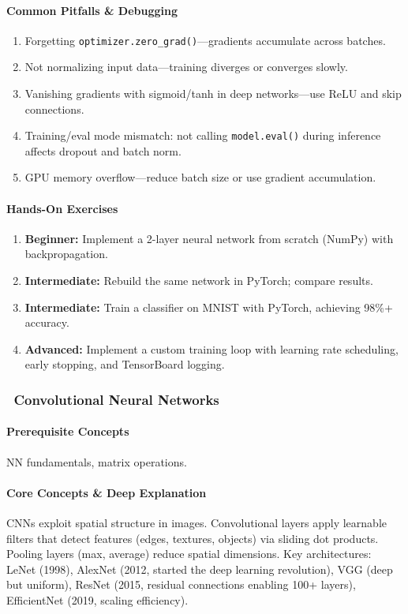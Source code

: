 \documentclass[11pt, a4paper, oneside]{report}
\newcommand{\mustmaster}[1]{\subsubsection{\texorpdfstring{\fcolorbox{blue!40!black}{blue!8}{\footnotesize\bfseries\color{blue!40!black} MUST MASTER}~#1}{#1}}}
\begin{document}
\paragraph{Common Pitfalls \& Debugging}
\begin{enumerate}[leftmargin=*]
\item Forgetting \texttt{optimizer.zero\_grad()}---gradients accumulate across batches.
\item Not normalizing input data---training diverges or converges slowly.
\item Vanishing gradients with sigmoid/tanh in deep networks---use ReLU and skip connections.
\item Training/eval mode mismatch: not calling \texttt{model.eval()} during inference affects dropout and batch norm.
\item GPU memory overflow---reduce batch size or use gradient accumulation.
\end{enumerate}

\paragraph{Hands-On Exercises}
\begin{enumerate}[leftmargin=*]
\item \textbf{Beginner:} Implement a 2-layer neural network from scratch (NumPy) with backpropagation.
\item \textbf{Intermediate:} Rebuild the same network in PyTorch; compare results.
\item \textbf{Intermediate:} Train a classifier on MNIST with PyTorch, achieving 98\%+ accuracy.
\item \textbf{Advanced:} Implement a custom training loop with learning rate scheduling, early stopping, and TensorBoard logging.
\end{enumerate}

\mustmaster{Convolutional Neural Networks}

\paragraph{Prerequisite Concepts} NN fundamentals, matrix operations.

\paragraph{Core Concepts \& Deep Explanation} CNNs exploit spatial structure in images. Convolutional layers apply learnable filters that detect features (edges, textures, objects) via sliding dot products. Pooling layers (max, average) reduce spatial dimensions. Key architectures: LeNet (1998), AlexNet (2012, started the deep learning revolution), VGG (deep but uniform), ResNet (2015, residual connections enabling 100+ layers), EfficientNet (2019, scaling efficiency).
\end{document}
